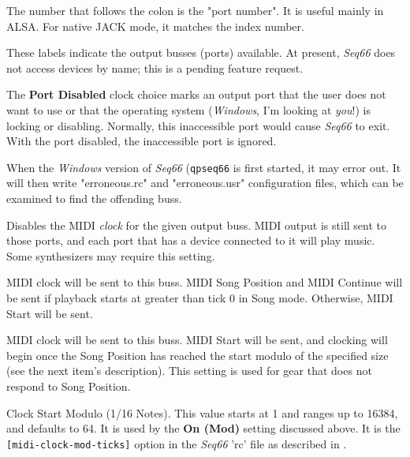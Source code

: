    The number that follows the colon is the "port number".
   It is useful mainly in ALSA.
   For native JACK mode, it matches the index number.

   These labels indicate the output busses (ports) available.
   At present, \textsl{Seq66} does not access devices by name; this is
   a pending feature request.

   The \textbf{Port Disabled} clock choice marks an output port
   that the user does not want to use or that the operating system
   (\textsl{Windows}, I'm looking at \textsl{you}!)
   is locking or disabling.
   Normally, this inaccessible port would cause \textsl{Seq66} to exit.
   With the port disabled, the inaccessible port is ignored.

   When the \textsl{Windows} version of \textsl{Seq66}
   (\texttt{qpseq66} is first started, it may error out.
   It will then write "erroneous.rc" and "erroneous.usr" configuration
   files, which can be examined to find the offending buss.

   Disables the MIDI \textsl{clock} for the given output buss.
   MIDI output is still sent to those ports, and
   each port that has a device connected to it will play music.
   Some synthesizers may require this setting.

   MIDI clock will be sent to this buss.
   MIDI Song Position and MIDI Continue will be sent if playback starts
   at greater than tick 0 in Song mode.  Otherwise, MIDI Start will be sent.

   MIDI clock will be sent to this buss.
   MIDI Start will be sent, and clocking will begin
   once the Song Position has reached the start modulo of the specified size
   (see the next item's description).
   This setting is used for gear that does not respond to Song Position.

   Clock Start Modulo (1/16 Notes).
   This value starts at 1 and ranges up to 16384, and defaults to 64.
   It is used by the \textbf{On (Mod)} setting discussed above.
   It is the \texttt{[midi-clock-mod-ticks]} option in the \textsl{Seq66}
   'rc' file as described in
   .

